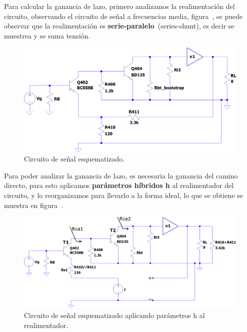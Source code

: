 \vspace{1cm}

Para calcular la ganancia de lazo, primero analizamos la realimentación del circuito, observando el circuito de señal a frecuencias media, figura~, se puede observar que la realimentación es \mbox{\textbf{serie-paralelo} (series-shunt)}, es decir se muestrea y se suma tensión.


\begin{figure}[H] %
\begin{center}
\includegraphics[width=0.75 \textwidth, angle=0]{./img/desarrollo/2_lazo_cerrado.png}
\caption{\label{fig:fig_scheme_signal_circuit}\footnotesize{Circuito de señal esquematizado.}}
\end{center}
\end{figure}

Para poder analizar la ganancia de lazo, es necesaria la ganancia del camino directo, para esto aplicamos \textbf{parámetros híbridos h} al realimentador del circuito, y lo reorganizamos para llevarlo a la forma ideal, lo que se obtiene se muestra en figura~.


\begin{figure}[H] %
\begin{center}
\includegraphics[width=0.75 \textwidth, angle=0]{./img/desarrollo/2-lazoCerradoIdeal.png}
\caption{\label{fig:fig_scheme_signal_circuit_h_parameters}\footnotesize{Circuito de señal esquematizado aplicando parámetros h al realimentador.}}
\end{center}
\end{figure}

